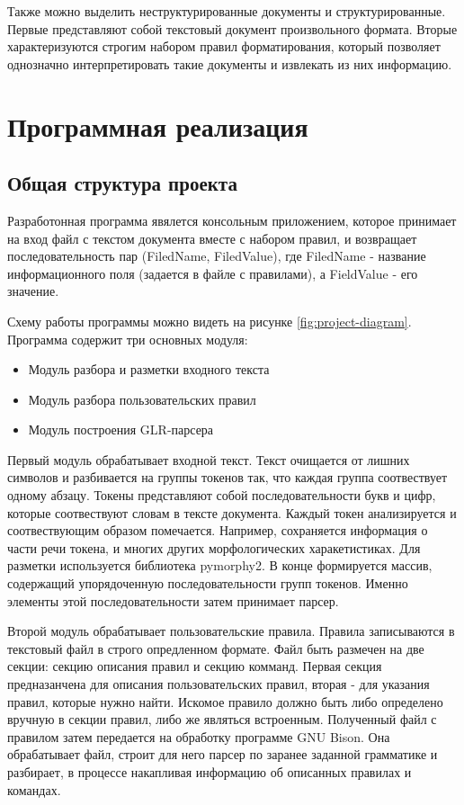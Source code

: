 Также можно выделить неструктурированные документы и структурированные. Первые представляют собой текстовый документ произвольного формата. Вторые характеризуются строгим набором правил форматирования, который позволяет однозначно интерпретировать такие документы и извлекать из них информацию.

\chapter{Программная реализация}
\section{Общая структура проекта}
Разработонная программа явялется консольным приложением, которое принимает на вход файл с текстом документа вместе с набором правил, и возвращает последовательность пар (FiledName, FiledValue), где FiledName - название информационного поля (задается в файле с правилами), а FieldValue - его значение.

Схему работы программы можно видеть на рисунке \ref{fig:project-diagram}. Программа содержит три основных модуля: 
\begin{itemize}
  \item Модуль разбора и разметки входного текста
  \item Модуль разбора пользовательских правил
  \item Модуль построения GLR-парсера
\end{itemize}

Первый модуль обрабатывает входной текст. Текст очищается от лишних символов и разбивается на группы токенов так, что каждая группа соотвествует одному абзацу. Токены представляют собой последовательности букв и цифр, которые соотвествуют словам в тексте документа. Каждый токен анализируется и соотвествующим образом помечается. Например, сохраняется информация о части речи токена, и многих других морфологических харакетистиках. Для разметки используется библиотека pymorphy2. В конце формируется массив, содержащий упорядоченную последовательности групп токенов. Именно элементы этой последовательности затем принимает парсер.

Второй модуль обрабатывает пользовательские правила. Правила записываются в текстовый файл в строго опредленном формате. Файл быть размечен на две секции: секцию описания правил и секцию комманд. Первая секция предназанчена для описания пользовательских правил, вторая - для указания правил, которые нужно найти. Искомое правило должно быть либо определено вручную в секции правил, либо же являться встроенным. Полученный файл с правилом затем передается на обработку программе GNU Bison. Она обрабатывает файл, строит для него парсер по заранее заданной грамматике и разбирает, в процессе накапливая информацию об описанных правилах и командах.

